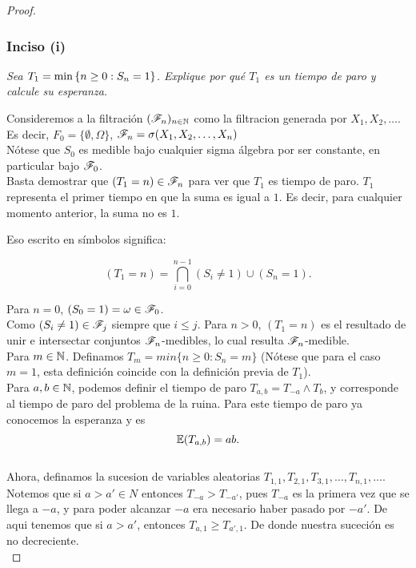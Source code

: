 \begin{proof}
	\subsubsection{Inciso (i)}
	\emph
	{
		Sea $T_1=\min\left\{ n\geq 0:S_n=1\right\} $. Explique por qu\'e $T_1$ es un 
		tiempo de paro y calcule su esperanza.\\
	}
	
		Consideremos a la filtración $(\mathscr{F}_n)_{n\in\mathbb{N}}$ como la filtracion 
		generada por $X_1, X_2, \dots$.\\

		Es decir, $F_0 = \{\emptyset, \Omega\}$, $\mathscr{F}_n = \sigma(X_1, X_2, \dots, X_n)$\\
	
		Nótese que $S_0$ es medible bajo cualquier sigma álgebra por ser constante, en particular bajo
		$\mathscr{F}_0$.\\
	
		Basta demostrar que $(T_1 = n) \in \mathscr{F}_n$ para ver que $T_1$ es tiempo de paro. $T_1$ 
		representa el primer tiempo en que la suma es igual a $1$. Es decir, para cualquier 
		momento anterior, la suma no es $1$.
	
		Eso escrito en símbolos significa:
	
		$$(T_1 = n) = \bigcap_{i=0}^{n-1}(S_i \not= 1) \cup (S_n = 1).$$ 
	
		Para $n=0$, $(S_0 = 1) = \omega \in \mathscr{F}_0$. \\
	
		Como $(S_i \not= 1) \in \mathscr{F}_j$ siempre que $i \leq j$. Para $n>0$, $(T_1 = n)$ es el resultado de 
		unir e intersectar conjuntos $\mathscr{F}_n$-medibles, lo cual resulta $\mathscr{F}_n$-medible.\\
	
		Para $m \in \mathbb{N}$. Definamos $T_m = min\{n \geq 0 : S_n = m\}$ 
		(Nótese que para el caso $m=1$, esta definición	coincide con la definición previa de $T_1$).\\
		
		Para $a,b \in \mathbb{N}$, podemos definir el tiempo de paro $T_{a,b} = T_{-a} \wedge T_b$, y 
		corresponde al 	tiempo de paro del problema de la ruina. Para este tiempo de paro ya conocemos 
		la esperanza y es
		$$\mathbb{E}(T_{a,b}) = ab.$$\\
		
		Ahora, definamos la sucesion de variables aleatorias $T_{1,1}, T_{2,1}, T_{3,1}, \dots, T_{n,1}, 
		\dots$. Notemos que si $a>a' \in N$ entonces $T_{-a} > T_{-a'}$, pues $T_{-a}$ es la primera vez
		que se llega a $-a$, y para poder alcanzar $-a$ era necesario haber pasado por $-a'$.
		De aqui tenemos que si $a>a'$, entonces $T_{a,1} \geq T_{a',1}$. De donde nuestra suceción es 
		no decreciente.\\
		

\end{proof}
